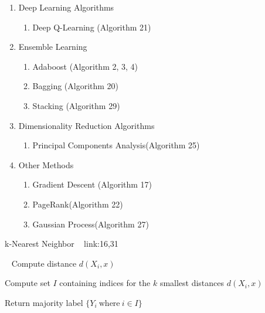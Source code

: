 \documentclass[a4paper]{article}
\begin{document}
\begin{enumerate}
\item Deep Learning Algorithms
\begin{enumerate}
   \item Deep Q-Learning (Algorithm 21)
\end{enumerate}

\item Ensemble Learning
\begin{enumerate}
   \item Adaboost (Algorithm 2, 3, 4)
    \item Bagging (Algorithm 20)
   \item Stacking  (Algorithm 29)
   
\end{enumerate}

\item Dimensionality Reduction Algorithms
\begin{enumerate}
\item Principal Components Analysis(Algorithm 25)

\end{enumerate}
\item Other Methods
\begin{enumerate}
   \item Gradient Descent (Algorithm 17)
   \item PageRank(Algorithm 22)
   \item Gaussian Process(Algorithm 27)
  
   
\end{enumerate}

\end{enumerate}


  \begin{algorithm}
 
   \caption{k-Nearest Neighbor  ~ \cite{knearest91} link:{16,31} }
    \begin{algorithmic}[1]
      \
            \State Compute distance $d{(X_i,x)}$
        \EndFor
        
         \State Compute set $I$ containing indices for the $k$ smallest distances $d{(X_i,x)}$
     
       \State Return majority label $\{Y_i \ \text{where}\ i \in I \}$



 \EndFunction
 


\end{algorithmic}
\end{algorithm}
\end{document}
